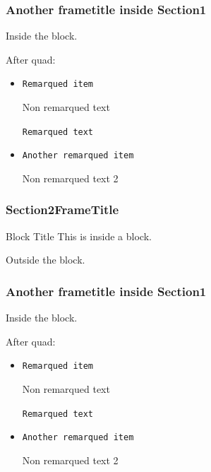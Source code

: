 \documentclass[10pt]{beamer}
\begin{document}
\begin{frame}
\frametitle{Another frametitle inside Section1}


\begin{block}{}
Inside the block.
\end{block}


\quad


After quad:

\begin{itemize}

\item {\tt Remarqued item}

Non remarqued text

{\tt Remarqued text} 

 \item {\tt Another remarqued item}

Non remarqued text 2 

\end{itemize}

\end{frame}




\begin{frame}[fragile]
\frametitle{Section2FrameTitle}

\begin{block}{Block Title}
This is inside a block.


\end{block}

Outside the block.

\end{frame}

\begin{frame}
\frametitle{Another frametitle inside Section1}


\begin{block}{}
Inside the block.
\end{block}


\quad


After quad:

\begin{itemize}

\item {\tt Remarqued item}

Non remarqued text

{\tt Remarqued text} 

 \item {\tt Another remarqued item}

Non remarqued text 2 

\end{itemize}

\end{frame}
\end{document}
